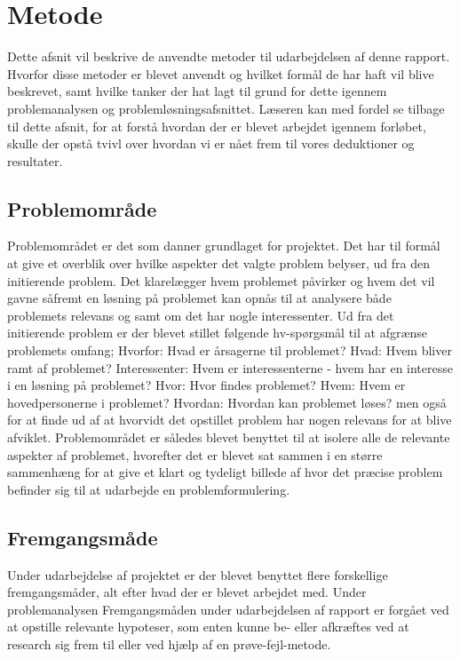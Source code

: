 \chapter{Metode}
Dette afsnit vil beskrive de anvendte metoder til udarbejdelsen af denne rapport. Hvorfor disse metoder er blevet anvendt og hvilket formål de har haft vil blive beskrevet, samt hvilke tanker der hat lagt til grund for dette igennem problemanalysen og problemløsningsafsnittet. Læseren kan med fordel se tilbage til dette afsnit, for at forstå hvordan der er blevet arbejdet igennem forløbet, skulle der opstå tvivl over hvordan vi er nået frem til vores deduktioner og resultater.

\section{Problemområde}
Problemområdet er det som danner grundlaget for projektet. Det har til formål at give et overblik over hvilke aspekter det valgte problem belyser, ud fra den initierende problem. Det klarelægger hvem problemet påvirker og hvem det vil gavne såfremt en løsning på problemet kan opnås til at analysere både problemets relevans og samt om det har nogle interessenter.  Ud fra det initierende problem er der blevet stillet følgende hv-spørgsmål til at afgrænse problemets omfang;
Hvorfor: Hvad er årsagerne til problemet?
Hvad: Hvem bliver ramt af problemet?
Interessenter: Hvem er interessenterne - hvem har en interesse i en løsning på problemet?
Hvor: Hvor findes problemet?
Hvem: Hvem er hovedpersonerne i problemet?
Hvordan: Hvordan kan problemet løses?
men også for at finde ud af at hvorvidt det opstillet problem har nogen relevans for at blive afviklet. Problemområdet er således blevet benyttet til at isolere alle de relevante aspekter af problemet, hvorefter det er blevet sat sammen i en større sammenhæng for at give et klart og tydeligt billede af hvor det præcise problem befinder sig til at udarbejde en problemformulering.

\section{Fremgangsmåde}
Under udarbejdelse af projektet er der blevet benyttet flere forskellige fremgangsmåder, alt efter hvad der er blevet arbejdet med. Under problemanalysen Fremgangsmåden under udarbejdelsen af rapport er forgået ved at opstille relevante hypoteser, som enten kunne be- eller afkræftes ved at research sig frem til eller ved hjælp af en prøve-fejl-metode.

